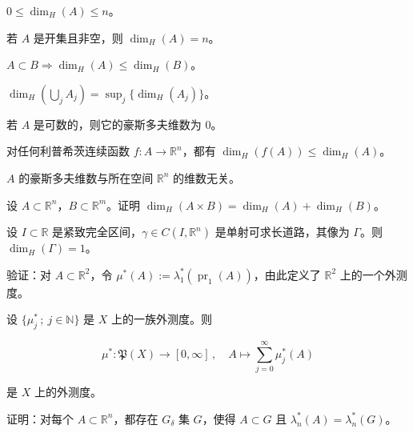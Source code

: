 \begin{exercises}
\begin{items}
\item

$ 0 \le \dim_H(A) \le n $。

\item

若 $ A $ 是开集且非空，则 $ \dim_H(A) = n $。

\item

$ A \subset B \Rightarrow \dim_H(A) \le \dim_H(B) $。

\item

$ \dim_H\left(\bigcup_j A_j\right) = \sup_j \{ \dim_H(A_j) \} $。

\item

若 $ A $ 是可数的，则它的豪斯多夫维数为 0。

\item

对任何利普希茨连续函数 $ f\colon A \to \mathbb{R}^n $，都有 $ \dim_H(f(A)) \le \dim_H(A) $。

\item

$ A $ 的豪斯多夫维数与所在空间 $ \mathbb{R}^n $ 的维数无关。

\end{items}

\item

设 $ A \subset \mathbb{R}^n $，$ B \subset \mathbb{R}^m $。证明 $ \dim_H(A \times B) = \dim_H(A) + \dim_H(B) $。

\item

设 $ I \subset \mathbb{R} $ 是紧致完全区间，$ \gamma \in C(I, \mathbb{R}^n) $ 是单射可求长道路，其像为 $ \Gamma $。则 $ \dim_H(\Gamma) = 1 $。

\item

验证：对 $ A \subset \mathbb{R}^2 $，令 $ \mu^*(A) := \lambda_1^*(\operatorname{pr}_1(A)) $，由此定义了 $ \mathbb{R}^2 $ 上的一个外测度。

\item

设 $ \{ \mu_j^* \,;\ j \in \mathbb{N} \} $ 是 $ X $ 上的一族外测度。则

\[
\mu^*\colon \mathfrak{P}(X) \to [0, \infty] \,, \quad A \mapsto \sum_{j=0}^{\infty} \mu_j^*(A)
\]

是 $ X $ 上的外测度。

\item

证明：对每个 $ A \subset \mathbb{R}^n $，都存在 $ G_\delta $ 集 $ G $，使得 $ A \subset G $ 且 $ \lambda_n^*(A) = \lambda_n^*(G) $。

\end{exercises}

